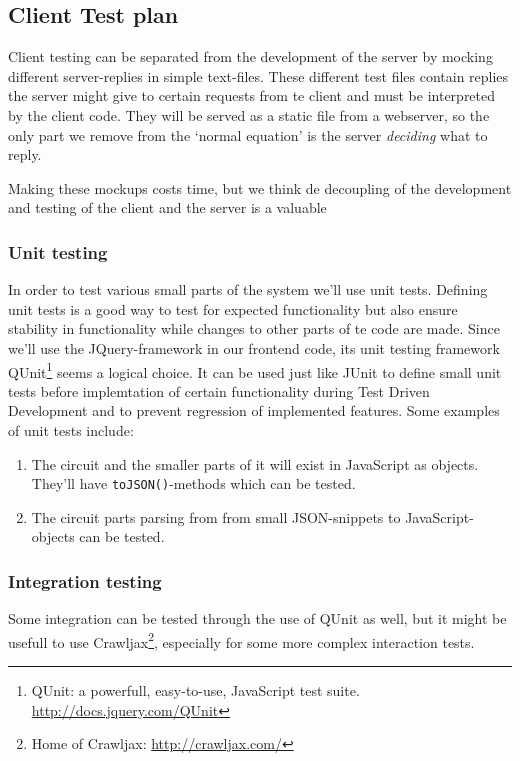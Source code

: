 \subsection{Client Test plan}
Client testing can be separated from the development of the server by mocking different server-replies in simple text-files. These different test files contain replies the server might give to certain requests from te client and must be interpreted by the client code. They will be served as a static file from a webserver, so the only part we remove from the `normal equation' is the server \textit{deciding} what to reply.

Making these mockups costs time, but we think de decoupling of the development and testing of the client and the server is a valuable

\subsubsection{Unit testing}
In order to test various small parts of the system we'll use unit tests. Defining unit tests is a good way to test for expected functionality but also ensure stability in functionality while changes to other parts of te code are made. Since we'll use the JQuery-framework in our frontend code, its unit testing framework QUnit\footnote{QUnit: a powerfull, easy-to-use, JavaScript test suite. \url{http://docs.jquery.com/QUnit}} seems a logical choice. It can be used just like JUnit to define small unit tests before implemtation of certain functionality during Test Driven Development and to prevent regression of implemented features. Some examples of unit tests include:
\begin{enumerate}
	\item The circuit and the smaller parts of it will exist in JavaScript as objects. They'll have \verb|toJSON()|-methods which can be tested.
	\item The circuit parts parsing from from small JSON-snippets to JavaScript-objects can be tested.
\end{enumerate}

\subsubsection{Integration testing}
Some integration can be tested through the use of QUnit as well, but it might be usefull to use Crawljax\footnote{Home of Crawljax: \url{http://crawljax.com/}}, especially for some more complex interaction tests.

